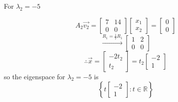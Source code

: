 \documentclass{article}
\begin{document}
For \(\lambda_2 = -5\)

\[
    A_2 \vec{v_2} =
    \begin{bmatrix}
        7  & 14 \\
        0 & 0
    \end{bmatrix}
    \begin{bmatrix}
        x_1 \\
        x_2
    \end{bmatrix}
    =
    \begin{bmatrix}
        0 \\0
    \end{bmatrix}
\]
\[
    \xrightarrow{R_1 = \frac{1}{7}R_1}
    \begin{bmatrix}
        1 & 2 \\
        0 & 0
    \end{bmatrix}
\]
\[
    \therefore \vec{x} = \begin{bmatrix}
        -2t_2 \\
        t_2
    \end{bmatrix}
    = t_2 \begin{bmatrix}
        -2 \\
        1
    \end{bmatrix}
\]
so the eigenspace for \(\lambda_2 = -5\) is
\[
    \left\{ t \begin{bmatrix}
        -2 \\
        1
    \end{bmatrix} : t \in \mathbb{R} \right\}
\]
\end{document}
